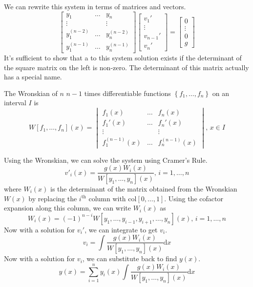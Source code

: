 \noindent
We can rewrite this system in terms of matrices and vectors.
\begin{equation*}
	\begin{bmatrix}
		y_1 & \ldots & y_n \\
		\vdots & & \vdots\\
		y_1^{(n-2)} & \ldots & y_n^{(n-2)} \\
		y_1^{(n-1)} & \ldots & y_n^{(n-1)}
	\end{bmatrix} \begin{bmatrix}
		v_1' \\
		\vdots \\
		v_{n-1}' \\
		v_n'
	\end{bmatrix} = \begin{bmatrix}
		0 \\
		\vdots \\
		0 \\
		g
	\end{bmatrix}
\end{equation*}
It's sufficient to show that a to this system solution exists if the determinant of the square matrix on the left is non-zero. The determinant of this matrix actually has a special name.

\begin{definition}
	The Wronskian of $n$ $n-1$ times differentiable functions $\left\{f_1, \ldots, f_n\right\}$ on an interval $I$ is
	\begin{equation*}
		W[f_1, \ldots, f_n](x) = \begin{vmatrix}
			f_1(x) & \ldots & f_n(x) \\
			f_1'(x) & \ldots & f_n'(x) \\
			\vdots &        & \vdots \\
			f_1^{(n-1)}(x) & \ldots & f_n^{(n-1)}(x)
		\end{vmatrix} \text{, } x \in I
	\end{equation*}
\end{definition} 

\noindent
Using the Wronskian, we can solve the system using Cramer's Rule.
\begin{equation*}
	v'_i(x) = \frac{g(x)W_i(x)}{W[y_1, \ldots, y_n](x)} \text{, } i = 1, \ldots, n
\end{equation*}
where $W_i(x)$ is the determinant of the matrix obtained from the Wronskian $W(x)$ by replacing the $i^{\text{th}}$ column with $\text{col}[0, \ldots, 1]$. Using the cofactor expansion along this column, we can write $W_i(x)$ as
\begin{equation*}
	W_i(x) = (-1)^{n-i}W[y_1, \ldots, y_{i-1}, y_{i+1}, \ldots, y_n](x) \text{, } i = 1, \ldots, n
\end{equation*}
Now with a solution for $v_i'$, we can integrate to get $v_i$.
\begin{equation*}
	v_i = \int{\frac{g(x)W_i(x)}{W[y_1, \ldots, y_n](x)} \mathrm{d}x}
\end{equation*}
Now with a solution for $v_i$, we can substitute back to find $y(x)$.
\begin{equation*}
	y(x) = \sum_{i=1}^{n}{y_i(x)\int{\frac{g(x)W_i(x)}{W[y_1, \ldots, y_n](x)} \mathrm{d}x}}
\end{equation*}

\ifodd{}\fi